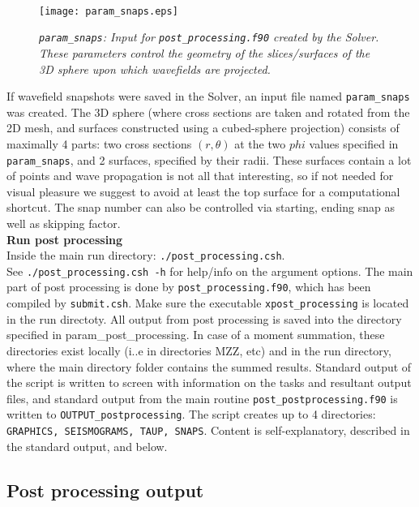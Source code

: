\documentclass[11pt,letter,fleqn,english,notitlepage]{article}
\begin{document}
\\
\begin{figure*}[htb]
\begin{center}
\texttt{[image: param\_snaps.eps]}
\caption{\textit{{\tt param\_snaps}: Input for {\tt post\_processing.f90} created by the Solver. These parameters 
control the geometry of the slices/surfaces of the 3D sphere upon which wavefields are projected.  }}
\end{center}
\end{figure*}

\noindent 
If wavefield snapshots were saved in the Solver, an input file named {\tt param\_snaps} was created.
The 3D sphere (where cross sections are taken and rotated from the 2D mesh, and surfaces constructed 
using a cubed-sphere projection) consists of maximally 4 parts: 
two cross sections $(r,\theta)$ at the two $phi$ values specified in {\tt param\_snaps}, 
and 2 surfaces, specified by their radii. These surfaces contain a lot of points and wave propagation is not 
all that interesting, so if not needed for visual pleasure we suggest to avoid at least the top surface for a computational
shortcut. The snap number can also be controlled via starting, ending snap as well as skipping factor. \\

\noindent \textbf{Run post processing}\\
Inside the main run directory: {\tt ./post\_processing.csh}.\\ See {\tt ./post\_processing.csh -h} for help/info on the 
argument options. The main part of post processing is done by {\tt post\_processing.f90}, which 
has been compiled by {\tt submit.csh}. Make sure the executable {\tt xpost\_processing} is located in the run directoty.
All output from post processing is saved into the directory specified in param\_post\_processing. 
In case of a moment summation, these directories exist locally (i..e in directories MZZ, etc) and in the run directory, where 
the main directory folder contains the summed results. Standard output of the script is written to screen with information 
on the tasks and resultant output files, and standard output from the main routine {\tt post\_postprocessing.f90} is 
written to {\tt OUTPUT\_postprocessing}. The script creates up to 4 directories: 
{\tt GRAPHICS, SEISMOGRAMS, TAUP, SNAPS}. 
Content is self-explanatory, described in the standard output, and below.
\newpage
\subsection{Post processing output}
\end{document}
